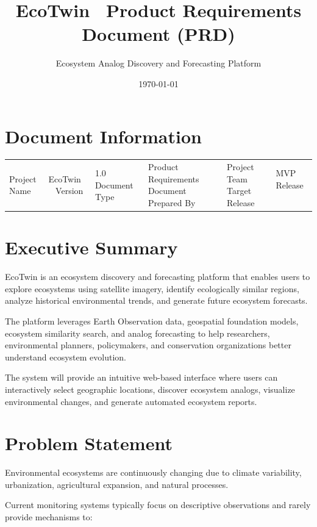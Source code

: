\documentclass[11pt,a4paper]{article}
\title{
EcoTwin \
Product Requirements Document (PRD)
}
\author{
Ecosystem Analog Discovery and Forecasting Platform
}
\date{\today}
\begin{document}
\maketitle
\tableofcontents
\newpage

\section{Document Information}

\begin{tabular}{|p{4cm}|p{8cm}|}
\hline
Project Name & EcoTwin \
\hline
Version & 1.0 \
\hline
Document Type & Product Requirements Document \
\hline
Prepared By & Project Team \
\hline
Target Release & MVP Release \
\hline
\end{tabular}

\vspace{1cm}

\section{Executive Summary}

EcoTwin is an ecosystem discovery and forecasting platform that enables users to explore ecosystems using satellite imagery, identify ecologically similar regions, analyze historical environmental trends, and generate future ecosystem forecasts.

The platform leverages Earth Observation data, geospatial foundation models, ecosystem similarity search, and analog forecasting to help researchers, environmental planners, policymakers, and conservation organizations better understand ecosystem evolution.

The system will provide an intuitive web-based interface where users can interactively select geographic locations, discover ecosystem analogs, visualize environmental changes, and generate automated ecosystem reports.

\section{Problem Statement}

Environmental ecosystems are continuously changing due to climate variability, urbanization, agricultural expansion, and natural processes.

Current monitoring systems typically focus on descriptive observations and rarely provide mechanisms to:
\end{document}
